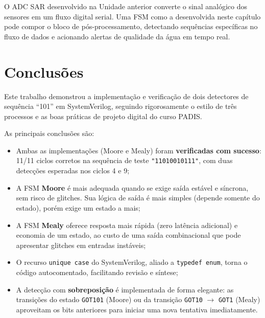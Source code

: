 \documentclass[12pt,a4paper]{article}
\begin{document}
\begin{unidadebox}
  O ADC SAR desenvolvido na Unidade anterior converte o sinal analógico dos
  sensores em um fluxo digital serial. Uma FSM como a desenvolvida neste capítulo
  pode compor o bloco de pós-processamento, detectando sequências específicas no
  fluxo de dados e acionando alertas de qualidade da água em tempo real.
\end{unidadebox}

\section{Conclusões}

Este trabalho demonstrou a implementação e verificação de dois detectores de
sequência ``101'' em SystemVerilog, seguindo rigorosamente o estilo de três
processos e as boas práticas de projeto digital do curso PADIS.

As principais conclusões são:

\begin{itemize}[leftmargin=1.5cm]
  \item Ambas as implementações (Moore e Mealy) foram \textbf{verificadas com
        sucesso}: 11/11 ciclos corretos na sequência de teste \texttt{"11010010111"},
        com duas detecções esperadas nos ciclos 4 e 9;

  \item A FSM \textbf{Moore} é mais adequada quando se exige saída estável e
        síncrona, sem risco de glitches. Sua lógica de saída é mais simples
        (depende somente do estado), porém exige um estado a mais;

  \item A FSM \textbf{Mealy} oferece resposta mais rápida (zero latência adicional)
        e economia de um estado, ao custo de uma saída combinacional que pode
        apresentar glitches em entradas instáveis;

  \item O recurso \texttt{unique case} do SystemVerilog, aliado a \texttt{typedef enum},
        torna o código autocomentado, facilitando revisão e síntese;

  \item A detecção com \textbf{sobreposição} é implementada de forma elegante:
        as transições do estado \texttt{GOT101} (Moore) ou da transição \texttt{GOT10}
        $\rightarrow$ \texttt{GOT1} (Mealy) aproveitam os bits anteriores para
        iniciar uma nova tentativa imediatamente.
\end{itemize}
\end{document}
